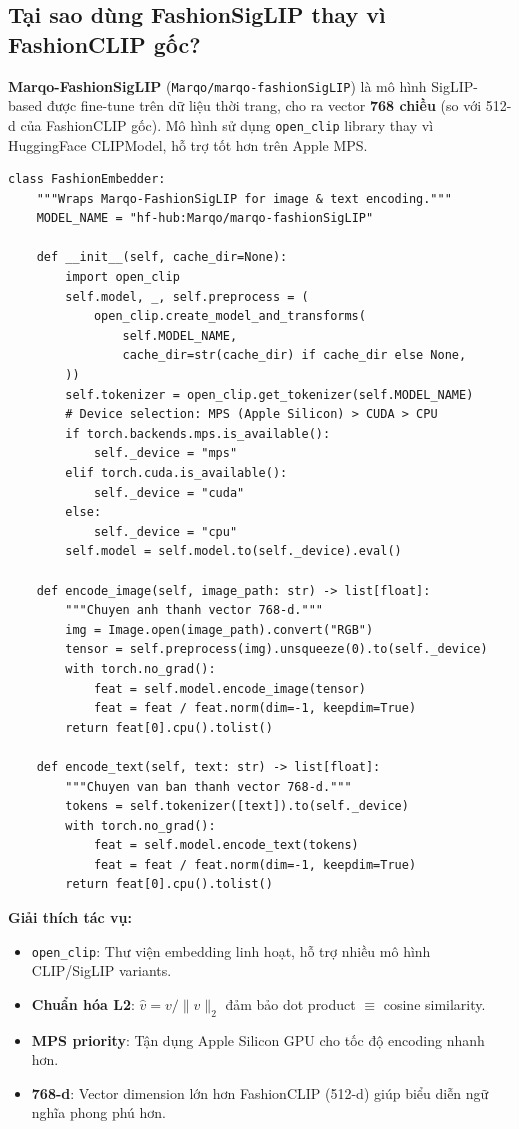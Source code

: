 \documentclass[12pt,a4paper]{report}
\begin{document}
\subsection{Tại sao dùng FashionSigLIP thay vì FashionCLIP gốc?}
\textbf{Marqo-FashionSigLIP} (\texttt{Marqo/marqo-fashionSigLIP}) là mô hình SigLIP-based được fine-tune trên dữ liệu thời trang, cho ra vector \textbf{768 chiều} (so với 512-d của FashionCLIP gốc). Mô hình sử dụng \texttt{open\_clip} library thay vì HuggingFace CLIPModel, hỗ trợ tốt hơn trên Apple MPS.

\begin{lstlisting}[caption={Class FashionEmbedder --- indexing/build\_index.py}]
class FashionEmbedder:
    """Wraps Marqo-FashionSigLIP for image & text encoding."""
    MODEL_NAME = "hf-hub:Marqo/marqo-fashionSigLIP"

    def __init__(self, cache_dir=None):
        import open_clip
        self.model, _, self.preprocess = (
            open_clip.create_model_and_transforms(
                self.MODEL_NAME,
                cache_dir=str(cache_dir) if cache_dir else None,
        ))
        self.tokenizer = open_clip.get_tokenizer(self.MODEL_NAME)
        # Device selection: MPS (Apple Silicon) > CUDA > CPU
        if torch.backends.mps.is_available():
            self._device = "mps"
        elif torch.cuda.is_available():
            self._device = "cuda"
        else:
            self._device = "cpu"
        self.model = self.model.to(self._device).eval()

    def encode_image(self, image_path: str) -> list[float]:
        """Chuyen anh thanh vector 768-d."""
        img = Image.open(image_path).convert("RGB")
        tensor = self.preprocess(img).unsqueeze(0).to(self._device)
        with torch.no_grad():
            feat = self.model.encode_image(tensor)
            feat = feat / feat.norm(dim=-1, keepdim=True)
        return feat[0].cpu().tolist()

    def encode_text(self, text: str) -> list[float]:
        """Chuyen van ban thanh vector 768-d."""
        tokens = self.tokenizer([text]).to(self._device)
        with torch.no_grad():
            feat = self.model.encode_text(tokens)
            feat = feat / feat.norm(dim=-1, keepdim=True)
        return feat[0].cpu().tolist()
\end{lstlisting}

\textbf{Giải thích tác vụ:}
\begin{itemize}
    \item \texttt{open\_clip}: Thư viện embedding linh hoạt, hỗ trợ nhiều mô hình CLIP/SigLIP variants.
    \item \textbf{Chuẩn hóa L2}: $\hat{v} = v / \|v\|_2$ đảm bảo dot product $\equiv$ cosine similarity.
    \item \textbf{MPS priority}: Tận dụng Apple Silicon GPU cho tốc độ encoding nhanh hơn.
    \item \textbf{768-d}: Vector dimension lớn hơn FashionCLIP (512-d) giúp biểu diễn ngữ nghĩa phong phú hơn.
\end{itemize}
\end{document}
